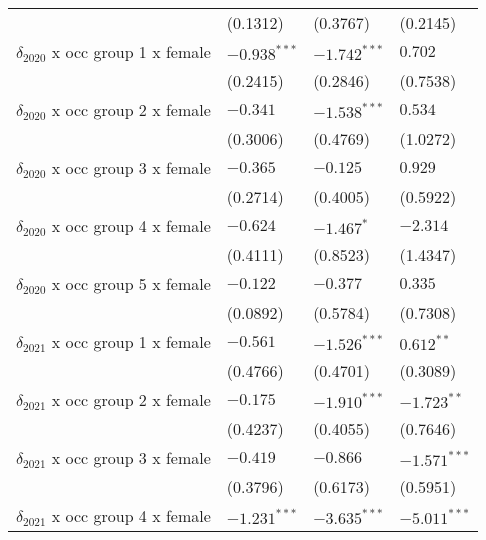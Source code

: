 \begin{tabular}{llll}
                                         &           (0.1312) &           (0.3767) &           (0.2145) \\
$\delta_{2020}$ x occ group 1 x female   &     $-0.938^{***}$ &     $-1.742^{***}$ &            $0.702$ \\
                                         &           (0.2415) &           (0.2846) &           (0.7538) \\
$\delta_{2020}$ x occ group 2 x female   &           $-0.341$ &     $-1.538^{***}$ &            $0.534$ \\
                                         &           (0.3006) &           (0.4769) &           (1.0272) \\
$\delta_{2020}$ x occ group 3 x female   &           $-0.365$ &           $-0.125$ &            $0.929$ \\
                                         &           (0.2714) &           (0.4005) &           (0.5922) \\
$\delta_{2020}$ x occ group 4 x female   &           $-0.624$ &         $-1.467^*$ &           $-2.314$ \\
                                         &           (0.4111) &           (0.8523) &           (1.4347) \\
$\delta_{2020}$ x occ group 5 x female   &           $-0.122$ &           $-0.377$ &            $0.335$ \\
                                         &           (0.0892) &           (0.5784) &           (0.7308) \\
$\delta_{2021}$ x occ group 1 x female   &           $-0.561$ &     $-1.526^{***}$ &       $0.612^{**}$ \\
                                         &           (0.4766) &           (0.4701) &           (0.3089) \\
$\delta_{2021}$ x occ group 2 x female   &           $-0.175$ &     $-1.910^{***}$ &      $-1.723^{**}$ \\
                                         &           (0.4237) &           (0.4055) &           (0.7646) \\
$\delta_{2021}$ x occ group 3 x female   &           $-0.419$ &           $-0.866$ &     $-1.571^{***}$ \\
                                         &           (0.3796) &           (0.6173) &           (0.5951) \\
$\delta_{2021}$ x occ group 4 x female   &     $-1.231^{***}$ &     $-3.635^{***}$ &     $-5.011^{***}$ \\

\end{tabular}
